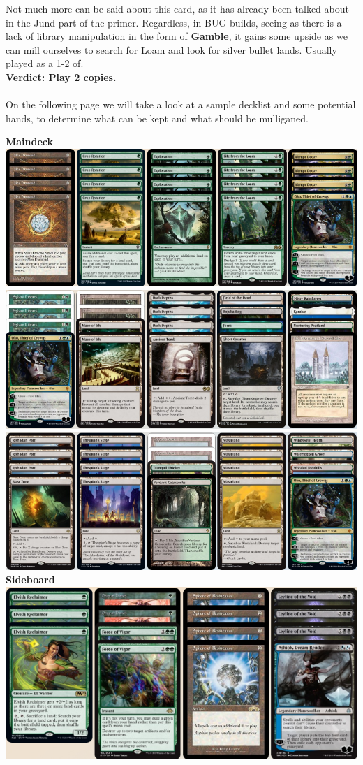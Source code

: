 \documentclass{report}
\begin{document}
Not much more can be said about this card, as it has already been talked about in the Jund part of the primer. Regardless, in BUG builds, seeing as there is a lack of library manipulation in the form of \textbf{Gamble}, it gains some upside as we can mill ourselves to search for Loam and look for silver bullet lands. Usually played as a 1-2 of.\\
\textbf{Verdict: Play 2 copies.}\\\\
On the following page we will take a look at a sample decklist and some potential hands, to determine what can be kept and what should be mulliganed.\\
\newpage
\begin{center}
\textbf{Maindeck\\}
\includegraphics [width =\textwidth] {bugland1}
\includegraphics [width =\textwidth] {bugland2}
\includegraphics [width =\textwidth] {bugland3}
\textbf{Sideboard\\}
\includegraphics [width =\textwidth] {buglandsb}
\end{center}
\end{document}
